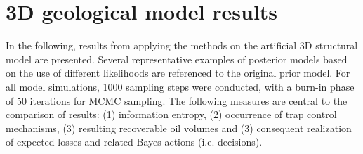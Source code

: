 				
		\section{3D geological model results}
		In the following, results from applying the methods on the artificial 3D structural model are presented. Several representative examples of posterior models based on the use of different likelihoods are referenced to the original prior model. For all model simulations, 1000 sampling steps were conducted, with a burn-in phase of 50 iterations for MCMC sampling. The following measures are central to the comparison of results: (1) information entropy, (2) occurrence of trap control mechanisms, (3) resulting recoverable oil volumes and (3) consequent realization of expected losses and related Bayes actions (i.e. decisions).
		
